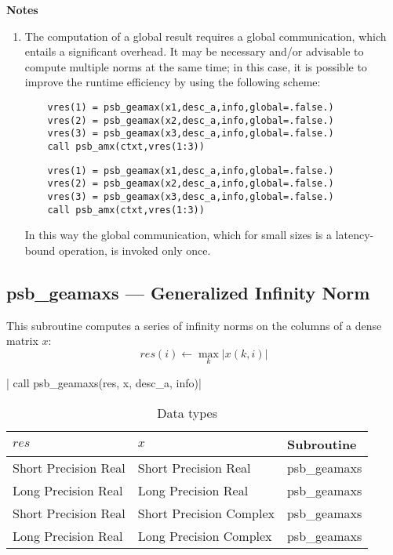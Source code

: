 {\par\noindent\large\bfseries Notes}
\begin{enumerate}
\item The computation of a global result requires a global
  communication, which entails a significant overhead. It may be
  necessary and/or advisable to compute multiple norms at the same
  time; in this case, it is possible to improve the runtime efficiency
  by using the following scheme:
  \ifpdf
  \begin{verbatim}
  	vres(1) = psb_geamax(x1,desc_a,info,global=.false.)
  	vres(2) = psb_geamax(x2,desc_a,info,global=.false.)
  	vres(3) = psb_geamax(x3,desc_a,info,global=.false.)
  	call psb_amx(ctxt,vres(1:3))
  \end{verbatim}
  \else
  \begin{lstlisting}
    vres(1) = psb_geamax(x1,desc_a,info,global=.false.)
    vres(2) = psb_geamax(x2,desc_a,info,global=.false.)
    vres(3) = psb_geamax(x3,desc_a,info,global=.false.)
    call psb_amx(ctxt,vres(1:3))
  \end{lstlisting}
  \fi
  In this way the global communication, which for small sizes is a
  latency-bound operation, is invoked only once.
\end{enumerate}

%
%

\clearpage\subsection{psb\_geamaxs --- Generalized Infinity Norm}

This subroutine computes a series of  infinity norms on the columns of
a  dense matrix  $x$:
\[ res(i) \leftarrow \max_k |x(k,i)| \]

\fortinline| call psb_geamaxs(res, x, desc_a, info)|

\begin{table}[h]
\begin{center}
\begin{tabular}{lll}
\hline
$res$&  $x$& {\bf Subroutine}\\
\hline
Short Precision Real    &Short Precision Real    & psb\_geamaxs\\
Long Precision Real    &Long Precision Real    & psb\_geamaxs\\
Short Precision Real &Short Precision Complex & psb\_geamaxs\\
Long Precision Real &Long Precision Complex & psb\_geamaxs\\
\hline
\end{tabular}
\end{center}
\caption{Data types\label{tab:f90mamax}}
\end{table}

